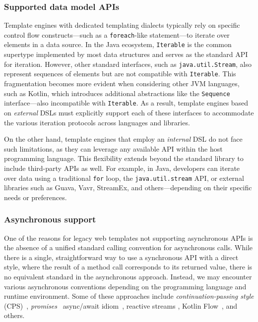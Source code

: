 \subsubsection{Supported data model APIs}

Template engines with dedicated templating dialects typically rely on specific
control flow constructs—such as a \texttt{foreach}-like statement—to iterate
over elements in a data source. In the Java ecosystem, \texttt{Iterable} is the
common supertype implemented by most data structures and serves as the standard
API for iteration. However, other standard interfaces, such as
\texttt{java.util.Stream}, also represent sequences of elements but are not
compatible with \texttt{Iterable}. This fragmentation becomes more evident when
considering other JVM languages, such as Kotlin, which introduces additional
abstractions like the \texttt{Sequence} interface—also incompatible with
\texttt{Iterable}. As a result, template engines based on \textit{external}
DSLs must explicitly support each of these interfaces to accommodate the
various iteration protocols across languages and libraries.

On the other hand, template engines that employ an \textit{internal} DSL do not
face such limitations, as they can leverage any available API within the host
programming language. This flexibility extends beyond the standard library to
include third-party APIs as well. For example, in Java, developers can iterate
over data using a traditional \texttt{for} loop, the \texttt{java.util.stream}
API, or external libraries such as Guava, Vavr, StreamEx, and others—depending
on their specific needs or preferences.


\subsubsection{Asynchronous support}
\label{sec:async-support}

One of the reasons for legacy web templates not supporting asynchronous APIs is
the absence of a unified standard calling convention for asynchronous calls.
While there is a single, straightforward way to use a synchronous API with a
direct style, where the result of a method call corresponds to its returned
value, there is no equivalent standard in the asynchronous approach. Instead,
we may encounter various asynchronous conventions depending on the programming
language and runtime environment. Some of these approaches include
\emph{continuation-passing style} (CPS)~\cite{scheme},
\textit{promises}~\cite{promise} async/await idiom~\cite{async_await}, reactive
streams \cite{ReactiveStreams}, Kotlin Flow~\cite{kotlinlang}, and others.

